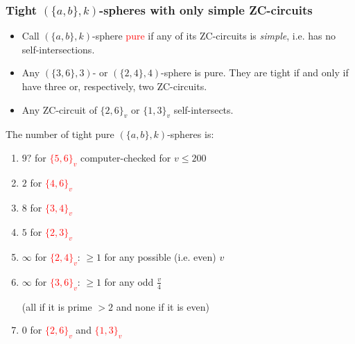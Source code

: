 \documentclass{beamer}
\begin{document}
\begin{frame}\frametitle{Tight $(\{a,b\},k)$-spheres with only simple
ZC-circuits}
\vspace{-1.5mm}
\begin{itemize}
\item
Call $(\{a,b\},k)$-sphere \textcolor{red}{pure} if any of its
ZC-circuits is {\em simple}, i.e. has no self-intersections.



\item Any $(\{3,6\},3)$- or $(\{2,4\},4)$-sphere is pure. They are
tight if and only if have three  or, respectively, two 
 ZC-circuits.
\item Any ZC-circuit of $\{2,6\}_v$ or  $\{1,3\}_v$
self-intersects.
\end{itemize}
\pause

The number of tight pure  $(\{a,b\},k)$-spheres is:
 
 \begin{enumerate}
\item
$9?$ for \textcolor{red}{$\{5,6\}_v$} computer-checked for 
$v\le 200$ 
\item
$2$ for \textcolor{red}{$\{4,6\}_v$}
\item
$8$ for \textcolor{red}{$\{3,4\}_v$}
\item
$5$ for \textcolor{red}{$\{2, 3\}_v$}  
\item $\infty$ for \textcolor{red}{$\{2,4\}_v$}: $\ge 1$ for any 
possible (i.e. even)
$v$
\item 
$\infty$ for \textcolor{red}{$\{3, 6\}_v$}: $\ge 1$ for any odd   
$\frac{v}{4}$ 

(all if it is prime $>2$ and none if it is even)
\item $0$ for  \textcolor{red}{$\{2, 6\}_v$} and  
\textcolor{red}{$\{1,3\}_v$}
\end{enumerate}
\end{frame}
\end{document}
